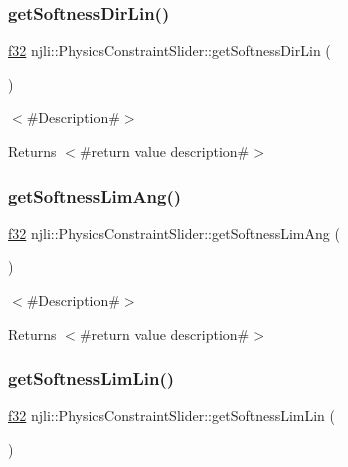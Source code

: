 \subsubsection{\texorpdfstring{get\+Softness\+Dir\+Lin()}{getSoftnessDirLin()}}
{\footnotesize\ttfamily \mbox{\hyperlink{_util_8h_a5f6906312a689f27d70e9d086649d3fd}{f32}} njli\+::\+Physics\+Constraint\+Slider\+::get\+Softness\+Dir\+Lin (\begin{DoxyParamCaption}{ }\end{DoxyParamCaption})}

$<$\#\+Description\#$>$

\begin{DoxyReturn}{Returns}
$<$\#return value description\#$>$ 
\end{DoxyReturn}
\mbox{\label{classnjli_1_1_physics_constraint_slider_a6462fac6e59d92dd741b200973b9dfbe}} 
\subsubsection{\texorpdfstring{get\+Softness\+Lim\+Ang()}{getSoftnessLimAng()}}
{\footnotesize\ttfamily \mbox{\hyperlink{_util_8h_a5f6906312a689f27d70e9d086649d3fd}{f32}} njli\+::\+Physics\+Constraint\+Slider\+::get\+Softness\+Lim\+Ang (\begin{DoxyParamCaption}{ }\end{DoxyParamCaption})}

$<$\#\+Description\#$>$

\begin{DoxyReturn}{Returns}
$<$\#return value description\#$>$ 
\end{DoxyReturn}
\mbox{\label{classnjli_1_1_physics_constraint_slider_ac93374ab5758d4e78bb38a1d42962642}} 
\subsubsection{\texorpdfstring{get\+Softness\+Lim\+Lin()}{getSoftnessLimLin()}}
{\footnotesize\ttfamily \mbox{\hyperlink{_util_8h_a5f6906312a689f27d70e9d086649d3fd}{f32}} njli\+::\+Physics\+Constraint\+Slider\+::get\+Softness\+Lim\+Lin (\begin{DoxyParamCaption}{ }\end{DoxyParamCaption})}

